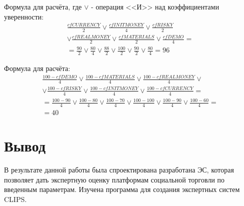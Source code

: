 	Формула для расчёта, где $\vee$ - операция <<И>> над коэффициентами уверенности:
	\begin{multline}
		\frac{cfCURRENCY}{2} \vee \frac{cfINITMONEY}{4} \vee \frac{cfRISKY}{2}\\
		\vee \frac{cfREALMONEY}{2} \vee \frac{cfMATERIALS}{2} \vee \frac{cfDEMO}{4} = \\
		= \frac{90}{2} \vee \frac{80}{4} \vee \frac{88}{2}
		\vee \frac{100}{2} \vee \frac{90}{2} \vee \frac{80}{4} = 96
	\end{multline}

	
	
	Формула для расчёта:
	\begin{multline}
		\frac{100-cfDEMO}{4} \vee \frac{100 - cfMATERIALS}{4} 	\vee \frac{100-cfREALMONEY}{4} \vee\\
		\vee \frac{100-cfRISKY}{4} \vee \frac{100-cfINITMONEY}{4} \vee \frac{100-cfCURRENCY}{4} =\\
		=\frac{100-90}{4} \vee \frac{100 - 80}{4} 	\vee \frac{100-70}{4}
		 \vee \frac{100-100}{4} \vee \frac{100-90}{4} \vee \frac{100-60}{4}=\\
		 = 40
	\end{multline}

\section{Вывод}
	В результате данной работы была спроектирована разработана ЭС, которая позволяет дать экспертную оценку платформам социальной торговли по введенным параметрам. Изучена программа для создания экспертных систем CLIPS.